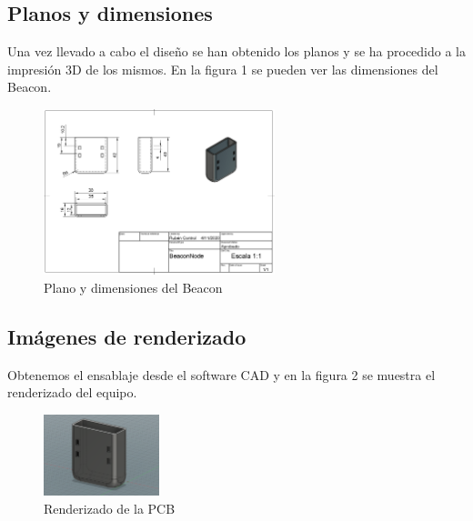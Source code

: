 \documentclass[paper=a4, fontsize=11pt,twoside]{scrartcl}
\begin{document}
    \subsection{Planos y dimensiones}
        Una vez llevado a cabo el diseño se han obtenido los planos y se ha procedido a la impresión 3D de los mismos. En la figura 1 
        se pueden ver las dimensiones del Beacon.
        \begin{center}
            \begin{figure}[h]
                \centering
                \includegraphics[width=0.6\textwidth]{../model_beacon.PNG}
                \caption{Plano y dimensiones del Beacon}
                \label{fig:mesh1}
            \end{figure}
        \end{center}
    \subsection{Imágenes de renderizado}
        Obtenemos el ensablaje desde el software CAD y en la figura 2 se muestra el renderizado del equipo.
        \begin{center}
            \begin{figure}[t]
                \centering
                \includegraphics[width=0.3\textwidth]{../mechanical_beacon.PNG}
                \caption{Renderizado de la PCB}
                \label{fig:mesh1}
            \end{figure}
        \end{center}
\end{document}
